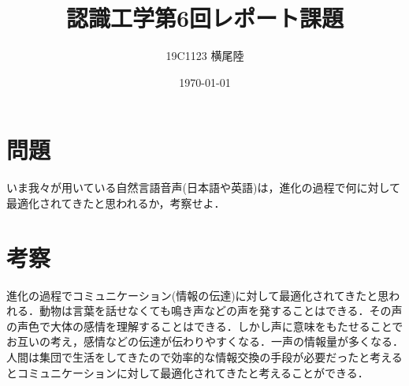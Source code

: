 \documentclass[dvipdfmx]{jsarticle}
\begin{document}
\title{認識工学第6回レポート課題}
\author{19C1123 横尾陸}
\date{\today}
\maketitle
\section*{問題}
いま我々が用いている自然言語音声(日本語や英語)は，進化の過程で何に対して最適化されてきたと思われるか，考察せよ．
\section*{考察}
進化の過程でコミュニケーション(情報の伝達)に対して最適化されてきたと思われる．動物は言葉を話せなくても鳴き声などの声を発することはできる．その声の声色で大体の感情を理解することはできる．しかし声に意味をもたせることでお互いの考え，感情などの伝達が伝わりやすくなる．一声の情報量が多くなる．人間は集団で生活をしてきたので効率的な情報交換の手段が必要だったと考えるとコミュニケーションに対して最適化されてきたと考えることができる．
\end{document}
